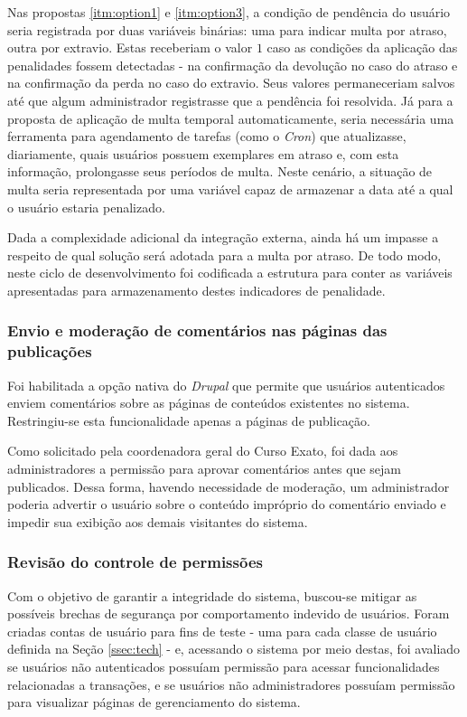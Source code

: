 \documentclass[a4paper]{article}
\begin{document}
Nas propostas \ref{itm:option1} e \ref{itm:option3}, a condição de pendência do usuário seria registrada por duas variáveis binárias: uma para indicar multa por atraso, outra por extravio. Estas receberiam o valor $1$ caso as condições da aplicação das penalidades fossem detectadas - na confirmação da devolução no caso do atraso e na confirmação da perda no caso do extravio. Seus valores permaneceriam salvos até que algum administrador registrasse que a pendência foi resolvida. Já para a proposta de aplicação de multa temporal automaticamente, seria necessária uma ferramenta para agendamento de tarefas (como o \textit{Cron}) que atualizasse, diariamente, quais usuários possuem exemplares em atraso e, com esta informação, prolongasse seus períodos de multa. Neste cenário, a situação de multa seria representada por uma variável capaz de armazenar a data até a qual o usuário estaria penalizado.

Dada a complexidade adicional da integração externa, ainda há um impasse a respeito de qual solução será adotada para a multa por atraso. De todo modo, neste ciclo de desenvolvimento foi codificada a estrutura para conter as variáveis apresentadas para armazenamento destes indicadores de penalidade.

\subsubsection{Envio e moderação de comentários nas páginas das publicações}

Foi habilitada a opção nativa do \textit{Drupal} que permite que usuários autenticados enviem comentários sobre as páginas de conteúdos existentes no sistema. Restringiu-se esta funcionalidade apenas a páginas de publicação.

Como solicitado pela coordenadora geral do Curso Exato, foi dada aos administradores a permissão para aprovar comentários antes que sejam publicados. Dessa forma, havendo necessidade de moderação, um administrador poderia advertir o usuário sobre o conteúdo impróprio do comentário enviado e impedir sua exibição aos demais visitantes do sistema.

\subsubsection{Revisão do controle de permissões}

Com o objetivo de garantir a integridade do sistema, buscou-se mitigar as possíveis brechas de segurança por comportamento indevido de usuários. Foram criadas contas de usuário para fins de teste - uma para cada classe de usuário definida na Seção \ref{ssec:tech} - e, acessando o sistema por meio destas, foi avaliado se usuários não autenticados possuíam permissão para acessar funcionalidades relacionadas a transações, e se usuários não administradores possuíam permissão para visualizar páginas de gerenciamento do sistema.
\end{document}
